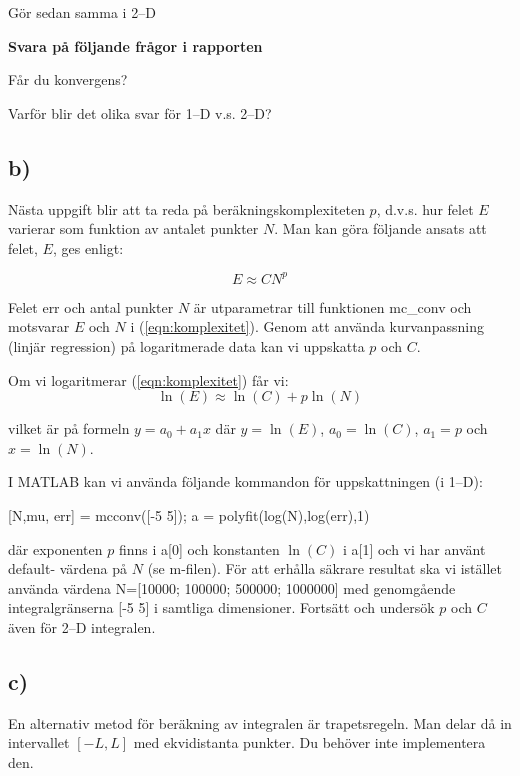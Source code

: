 \documentclass[a4paper]{article}
\begin{document}
Gör sedan samma i 2--D


\textbf{Svara på följande frågor i rapporten} 

Får du konvergens?

Varför blir det olika svar för 1--D v.s. 2--D?



\subsection{b)}
Nästa uppgift blir att ta reda på beräkningskomplexiteten \(p\), d.v.s.
hur felet \(E\) varierar som funktion av antalet punkter \(N\).
Man kan göra följande ansats att felet, \(E\), ges enligt:

\begin{equation} \label{eqn:komplexitet}
    E \approx CN^p
\end{equation}

Felet err och antal punkter \( N \)  är utparametrar till funktionen mc\_conv
och motsvarar \(E\)  och \(N\) i (\ref{eqn:komplexitet}). 
Genom att använda kurvanpassning (linjär regression) på logaritmerade data kan vi uppskatta \(p\) och \(C\).

Om vi logaritmerar (\ref{eqn:komplexitet}) får vi:
\begin{equation} \label{eqn:loggad}
    \ln (E) \approx \ln (C) +p \ln (N)
\end{equation}

vilket är på formeln \(y=a_0+a_1x\) där \(y=\ln(E)\), \(a_0=\ln(C)\), \(a_1=p\) och \(x=\ln(N)\).


I MATLAB kan vi använda följande kommandon för uppskattningen (i 1--D):

[N,mu, err] = mcconv([-5 5]); a = polyfit(log(N),log(err),1)

där exponenten \(p\)  finns i a[0] och konstanten \( \ln (C) \) i a[1] och vi har använt default- värdena på \( N \)  (se m-filen).
För att erhålla säkrare resultat ska vi istället använda värdena N=[10000; 100000; 500000; 1000000] 
med genomgående integralgränserna [-5 5] i samtliga dimensioner. 
Fortsätt och undersök \( p \)  och \( C \)  även för 2--D integralen.


\subsection{c)}
En alternativ metod för beräkning av integralen är trapetsregeln. 
Man delar då in intervallet \([-L, L]\) med ekvidistanta punkter. 
Du behöver inte implementera den. 
\end{document}
